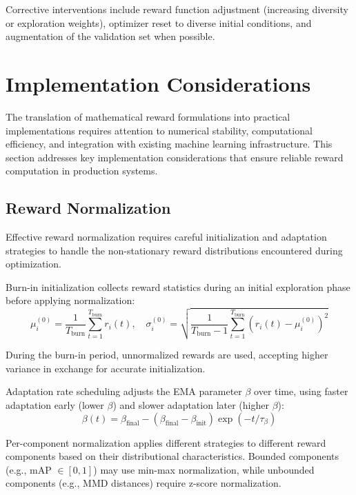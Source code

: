 Corrective interventions include reward function adjustment (increasing diversity or exploration weights), optimizer reset to diverse initial conditions, and augmentation of the validation set when possible.

\section{Implementation Considerations}
\label{sec:implementation}

The translation of mathematical reward formulations into practical implementations requires attention to numerical stability, computational efficiency, and integration with existing machine learning infrastructure. This section addresses key implementation considerations that ensure reliable reward computation in production systems.

\subsection{Reward Normalization}

Effective reward normalization requires careful initialization and adaptation strategies to handle the non-stationary reward distributions encountered during optimization.

Burn-in initialization collects reward statistics during an initial exploration phase before applying normalization:
\begin{equation}
\mu_i^{(0)} = \frac{1}{T_{\text{burn}}} \sum_{t=1}^{T_{\text{burn}}} r_i(t), \quad \sigma_i^{(0)} = \sqrt{\frac{1}{T_{\text{burn}}-1} \sum_{t=1}^{T_{\text{burn}}} (r_i(t) - \mu_i^{(0)})^2}
\label{eq:burnin_initialization}
\end{equation}

During the burn-in period, unnormalized rewards are used, accepting higher variance in exchange for accurate initialization.

Adaptation rate scheduling adjusts the EMA parameter $\beta$ over time, using faster adaptation early (lower $\beta$) and slower adaptation later (higher $\beta$):
\begin{equation}
\beta(t) = \beta_{\text{final}} - (\beta_{\text{final}} - \beta_{\text{init}}) \exp(-t / \tau_\beta)
\label{eq:beta_schedule}
\end{equation}

Per-component normalization applies different strategies to different reward components based on their distributional characteristics. Bounded components (e.g., mAP $\in [0,1]$) may use min-max normalization, while unbounded components (e.g., MMD distances) require z-score normalization.

